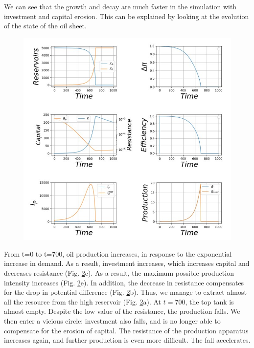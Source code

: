 \documentclass[12pt,a4paper]{article}%
\begin{document}
\begin{appendix}
\begin{figure}[h]
	\label{Fig13}
\end{figure}
We can see that the growth and decay are much faster in the simulation with investment and capital erosion. This can be explained by looking at the evolution of the state of the oil sheet.  
\begin{figure}[h] 
	\centering 
	\includegraphics[width=1.0\textwidth]{figures/Tableau-Bord14.jpg}
	\label{Fig14}
\end{figure} From t=0 to t=700, oil production increases, in response to the exponential increase in demand. As a result, investment increases, which increases capital and decreases resistance (Fig. \ref{Fig14}c). As a result, the maximum possible production intensity increases (Fig. \ref{Fig14}e). In addition, the decrease in resistance compensates for the drop in potential difference (Fig. \ref{Fig14}b). Thus, we manage to extract almost all the resource from the high reservoir (Fig. \ref{Fig14}a). At $t=700$, the top tank is almost empty. Despite the low value of the resistance, the production falls.  We then enter a vicious circle: investment also falls, and is no longer able to compensate for the erosion of capital. The resistance of the production apparatus increases again, and further production is even more difficult. The fall accelerates.
 
\end{appendix}
\end{document}
